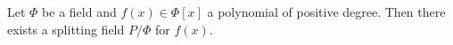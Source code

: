 Let $\Phi$ be a field and $f(x) \in \Phi[x]$ a polynomial of positive degree. Then there exists a splitting field $P/\Phi$ for $f(x)$.
